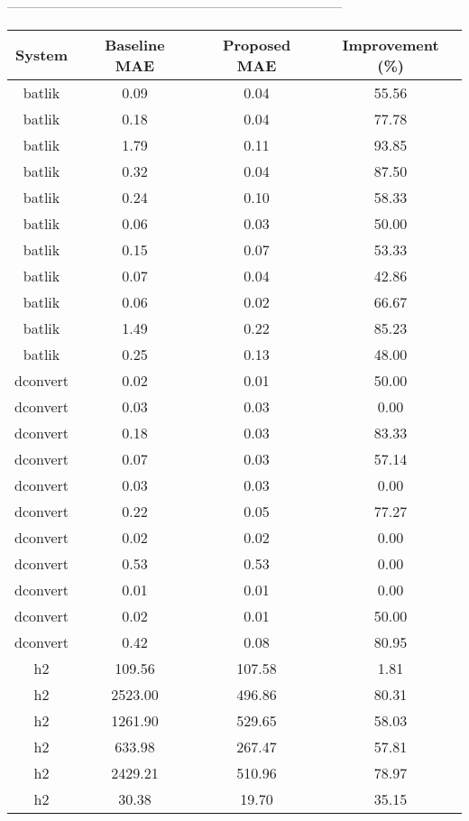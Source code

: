 --------------------------------------------------------------------------------
\begin{table}[h]
    \centering
    \begin{tabular}{|c|c|c|c|}
        \hline
        System & Baseline MAE & Proposed MAE & Improvement (\%) \\
        \hline
        batlik & 0.09 & 0.04 & 55.56 \\
        batlik & 0.18 & 0.04 & 77.78 \\
        batlik & 1.79 & 0.11 & 93.85 \\
        batlik & 0.32 & 0.04 & 87.50 \\
        batlik & 0.24 & 0.10 & 58.33 \\
        batlik & 0.06 & 0.03 & 50.00 \\
        batlik & 0.15 & 0.07 & 53.33 \\
        batlik & 0.07 & 0.04 & 42.86 \\
        batlik & 0.06 & 0.02 & 66.67 \\
        batlik & 1.49 & 0.22 & 85.23 \\
        batlik & 0.25 & 0.13 & 48.00 \\
        dconvert & 0.02 & 0.01 & 50.00 \\
        dconvert & 0.03 & 0.03 & 0.00 \\
        dconvert & 0.18 & 0.03 & 83.33 \\
        dconvert & 0.07 & 0.03 & 57.14 \\
        dconvert & 0.03 & 0.03 & 0.00 \\
        dconvert & 0.22 & 0.05 & 77.27 \\
        dconvert & 0.02 & 0.02 & 0.00 \\
        dconvert & 0.53 & 0.53 & 0.00 \\
        dconvert & 0.01 & 0.01 & 0.00 \\
        dconvert & 0.02 & 0.01 & 50.00 \\
        dconvert & 0.42 & 0.08 & 80.95 \\
        h2 & 109.56 & 107.58 & 1.81 \\
        h2 & 2523.00 & 496.86 & 80.31 \\
        h2 & 1261.90 & 529.65 & 58.03 \\
        h2 & 633.98 & 267.47 & 57.81 \\
        h2 & 2429.21 & 510.96 & 78.97 \\
        h2 & 30.38 & 19.70 & 35.15 \\

\end{tabular}
\end{table}
